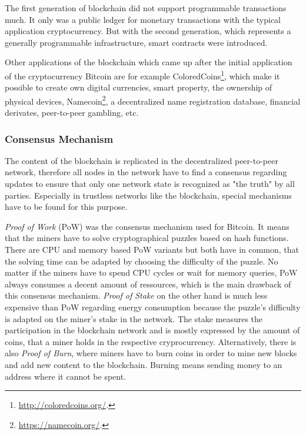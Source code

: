 \documentclass[conference]{IEEEtran}
\begin{document}
The first generation of blockchain did not support programmable transactions much. It only was a public ledger for monetary transactions with the typical application cryptocurrency. But with the second generation, which represents a generally programmable infrastructure, smart contracts were introduced. \cite{Xu2016} \par 
Other applications of the blockchain which came up after the initial application of the cryptocurrency Bitcoin are for example ColoredCoins\footnote{\url{http://coloredcoins.org/}.}, which make it possible to create own digital currencies, smart property, the ownership of physical devices, Namecoin\footnote{\url{https://namecoin.org/}.}, a decentralized name registration database, financial derivates, peer-to-peer gambling, etc. \cite{Buterin2014}

\subsubsection{Consensus Mechanism}
The content of the blockchain is replicated in the decentralized peer-to-peer network, therefore all nodes in the network have to find a consensus regarding updates to ensure that only one network state is recognized as "the truth" by all parties. Especially in trustless networks like the blockchain, special mechanisms have to be found for this purpose. \cite{Dinh?}\par 
\textit{Proof of Work} (PoW) was the consensus mechanism used for Bitcoin. It means that the miners have to solve cryptographical puzzles based on hash functions. There are CPU and memory based PoW variants but both have in common, that the solving time can be adapted by choosing the difficulty of the puzzle. No matter if the miners have to spend CPU cycles or wait for memory queries, PoW always consumes a decent amount of ressources, which is the main drawback of this consensus mechanism. \cite{Dinh?} \cite{Golze2009}
\textit{Proof of Stake} on the other hand is much less expensive than PoW regarding energy consumption because the puzzle's difficulty is adapted on the miner's stake in the network. The stake measures the participation in the blockchain network and is mostly expressed by the amount of coins, that a miner holds in the respective cryprocurrency. Alternatively, there is also \textit{Proof of Burn}, where miners have to burn coins in order to mine new blocks and add new content to the blockchain. Burning means sending money to an address where it cannot be spent. \cite{Dinh?} \par
\end{document}

